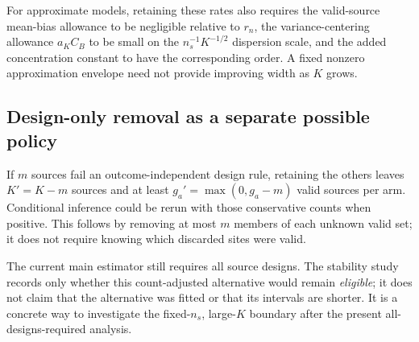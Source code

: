 For approximate models, retaining these rates also requires the valid-source
mean-bias allowance to be negligible relative to $r_n$, the variance-centering
allowance $a_KC_B$ to be small on the $n_s^{-1}K^{-1/2}$ dispersion scale, and
the added concentration constant to have the corresponding order. A fixed
nonzero approximation envelope need not provide improving width as $K$ grows.

\subsection{Design-only removal as a separate possible policy}

If $m$ sources fail an outcome-independent design rule, retaining the others
leaves $K'=K-m$ sources and at least $g_a'=\max(0,g_a-m)$ valid sources per
arm. Conditional inference could be rerun with those conservative counts when
positive. This follows by removing at most $m$ members of each unknown valid
set; it does not require knowing which discarded sites were valid.

The current main estimator still requires all source designs. The stability
study records only whether this count-adjusted alternative would remain
\emph{eligible}; it does not claim that the alternative was fitted or that its
intervals are shorter. It is a concrete way to investigate the fixed-$n_s$,
large-$K$ boundary after the present all-designs-required analysis.
